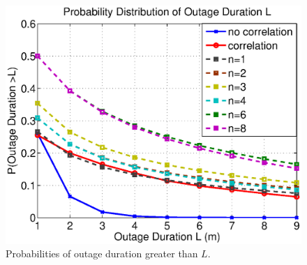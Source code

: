 \documentclass{beamer}
\begin{document}
%
%
%
%
%
\begin{frame}
\begin{figure}
\includegraphics[width=12cm]{result_Plot.eps}
\caption{Probabilities of outage duration greater than $L$.}
\end{figure}
\end{frame}
%
\end{document}
